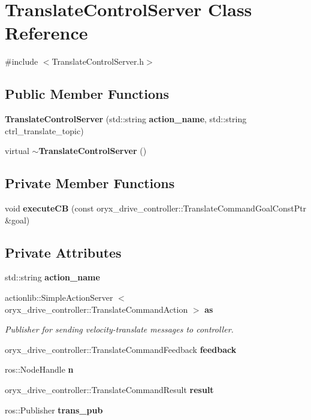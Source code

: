 \section{\-Translate\-Control\-Server \-Class \-Reference}
\label{classTranslateControlServer}


{\ttfamily \#include $<$\-Translate\-Control\-Server.\-h$>$}

\subsection*{\-Public \-Member \-Functions}
\begin{DoxyCompactItemize}
\item 
{\bf \-Translate\-Control\-Server} (std\-::string {\bf action\-\_\-name}, std\-::string ctrl\-\_\-translate\-\_\-topic)
\item 
virtual {\bf $\sim$\-Translate\-Control\-Server} ()
\end{DoxyCompactItemize}
\subsection*{\-Private \-Member \-Functions}
\begin{DoxyCompactItemize}
\item 
void {\bf execute\-C\-B} (const oryx\-\_\-drive\-\_\-controller\-::\-Translate\-Command\-Goal\-Const\-Ptr \&goal)
\end{DoxyCompactItemize}
\subsection*{\-Private \-Attributes}
\begin{DoxyCompactItemize}
\item 
std\-::string {\bf action\-\_\-name}
\item 
actionlib\-::\-Simple\-Action\-Server\*
$<$ oryx\-\_\-drive\-\_\-controller\-::\-Translate\-Command\-Action $>$ {\bf as}
\begin{DoxyCompactList}\small\item\em \-Publisher for sending velocity-\/translate messages to controller. \end{DoxyCompactList}\item 
oryx\-\_\-drive\-\_\-controller\-::\-Translate\-Command\-Feedback {\bf feedback}
\item 
ros\-::\-Node\-Handle {\bf n}
\item 
oryx\-\_\-drive\-\_\-controller\-::\-Translate\-Command\-Result {\bf result}
\item 
ros\-::\-Publisher {\bf trans\-\_\-pub}
\end{DoxyCompactItemize}


